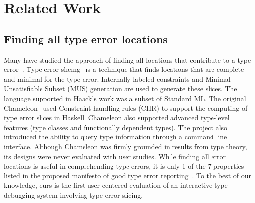 \section{Related Work}



\subsection{Finding all type error locations}
Many have studied the approach of finding all locations that contribute to a type error~\cite{Stuckey2003-pz, Haack2004-fr, Pavlinovic2015-ke, Schilling2012-iq}. Type error slicing~\cite{Haack2004-fr} is a technique that finds locations that are complete and minimal for the type error. Internally labeled constraints and Minimal Unsatisfiable Subset (MUS) generation are used to generate these slices. The language supported in Haack's work was a subset of Standard ML. The original Chameleon~\cite{Stuckey2003-pz} used  Constraint handling rules (CHR) to support the computing of type error slices in Haskell. Chameleon also supported advanced type-level features (type classes and functionally dependent types). The project also introduced the ability to query type information through a command line interface. Although Chameleon was firmly grounded in results from type theory, its designs were never evaluated with user studies. While finding all error locations is useful in comprehending type errors, it is only 1 of the 7 properties listed in the proposed manifesto of good type error reporting~\cite{Yang2000-wn}.
To the best of our knowledge, ours is the first user-centered evaluation of an interactive type debugging system involving type-error slicing.


